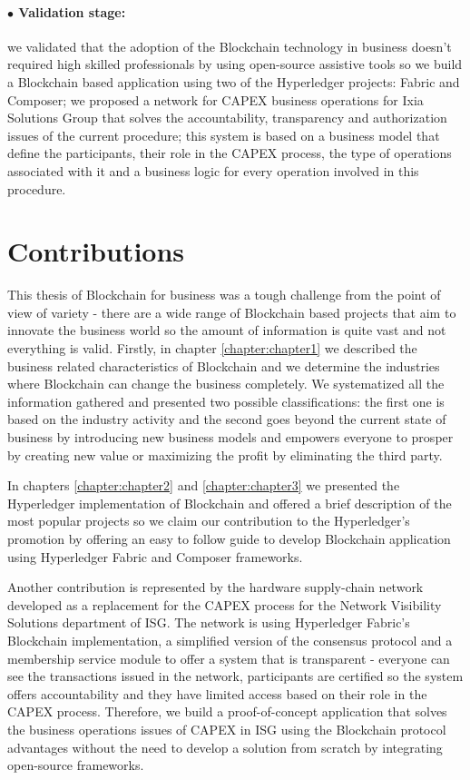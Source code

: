 \paragraph{$\bullet$ Validation stage:} we validated that the adoption of the Blockchain technology in business doesn't required high skilled professionals by using open-source assistive tools so we build a Blockchain based application using two of the Hyperledger projects: Fabric and Composer; we proposed a network for CAPEX business operations for Ixia Solutions Group that solves the accountability, transparency and authorization issues of the current procedure; this system is based on a business model that define the participants, their role in the CAPEX process, the type of operations associated with it and a business logic for every operation involved in this procedure.

\section{Contributions}
\label{sec:intro-sec3}
This thesis of Blockchain for business was a tough challenge from the point of view of variety - there are a wide range of Blockchain based projects that aim to innovate the business world so the amount of information is quite vast and not everything is valid. Firstly, in chapter \ref{chapter:chapter1} we described the business related characteristics of Blockchain and we determine the industries where Blockchain can change the business completely. We systematized all the information gathered and presented two possible classifications: the first one is based on the industry activity and the second goes beyond the current state of business by introducing new business models and empowers everyone to prosper by creating new value or maximizing the profit by eliminating the third party.  

In chapters \ref{chapter:chapter2} and \ref{chapter:chapter3} we presented the Hyperledger implementation of Blockchain and offered a brief description of the most popular projects so we claim our contribution to the Hyperledger's promotion by offering an easy to follow guide to develop Blockchain application using Hyperledger Fabric and Composer frameworks.

Another contribution is represented by the hardware supply-chain network developed as a replacement for the CAPEX process for the Network Visibility Solutions department of ISG. The network is using Hyperledger Fabric's Blockchain implementation, a simplified version of the consensus protocol and a membership service module to offer a system that is transparent - everyone can see the transactions issued in the network, participants are certified so the system offers accountability and they have limited access based on their role in the CAPEX process. Therefore, we build a proof-of-concept application that solves the business operations issues of CAPEX in ISG using the Blockchain protocol advantages without the need to develop a solution from scratch by integrating open-source frameworks.
